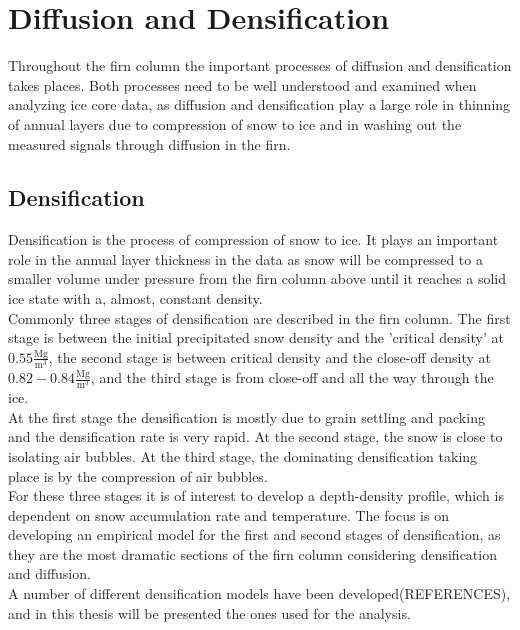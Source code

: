 \documentclass[../../CompleteThesis/Complete_1stDraft.tex]{subfiles}
\begin{document}
\section[Diffusion and Densification][Diffusion and Densification]{Diffusion and Densification}
Throughout the firn column the important processes of diffusion and densification takes places. Both processes need to be well understood and examined when analyzing ice core data, as diffusion and densification play a large role in thinning of annual layers due to compression of snow to ice and in washing out the measured signals through diffusion in the firn.

\subsection[Densification][Densification]{Densification}
\label{Sec:Densification}
Densification is the process of compression of snow to ice. It plays an important role in the annual layer thickness in the data as snow will be compressed to a smaller volume under pressure from the firn column above until it reaches a solid ice state with a, almost, constant density. \\
Commonly three stages of densification are described in the firn column. The first stage is between the initial precipitated snow density and the 'critical density' at $0.55 \frac{\text{Mg}}{\text{m}^3}$, the second stage is between critical density and the close-off density at $0.82-0.84 \frac{\text{Mg}}{\text{m}^3}$, and the third stage is from close-off and all the way through the ice.\\
At the first stage the densification is mostly due to grain settling and packing and the densification rate is very rapid. At the second stage, the snow is close to isolating air bubbles. At the third stage, the dominating densification taking place is by the compression of air bubbles.\\
For these three stages it is of interest to develop a depth-density profile, which is dependent on snow accumulation rate and temperature. The focus is on developing an empirical model for the first and second stages of densification, as they are the most dramatic sections of the firn column considering densification and diffusion.\\
A number of different densification models have been developed(REFERENCES), and in this thesis will be presented the ones used for the analysis.
\end{document}
